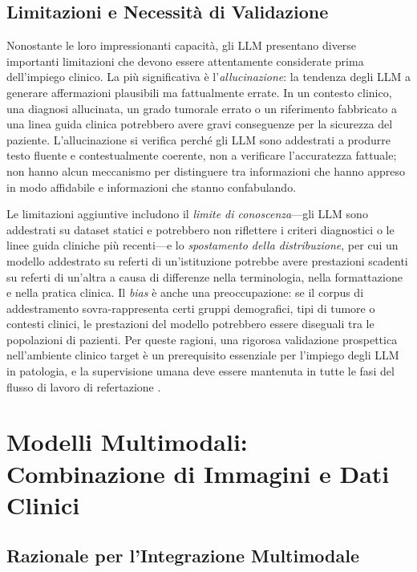\subsection{Limitazioni e Necessità di Validazione}

Nonostante le loro impressionanti capacità, gli LLM presentano diverse importanti limitazioni che devono essere attentamente considerate prima dell'impiego clinico. La più significativa è l'\emph{allucinazione}: la tendenza degli LLM a generare affermazioni plausibili ma fattualmente errate. In un contesto clinico, una diagnosi allucinata, un grado tumorale errato o un riferimento fabbricato a una linea guida clinica potrebbero avere gravi conseguenze per la sicurezza del paziente. L'allucinazione si verifica perché gli LLM sono addestrati a produrre testo fluente e contestualmente coerente, non a verificare l'accuratezza fattuale; non hanno alcun meccanismo per distinguere tra informazioni che hanno appreso in modo affidabile e informazioni che stanno confabulando.

Le limitazioni aggiuntive includono il \emph{limite di conoscenza}---gli LLM sono addestrati su dataset statici e potrebbero non riflettere i criteri diagnostici o le linee guida cliniche più recenti---e lo \emph{spostamento della distribuzione}, per cui un modello addestrato su referti di un'istituzione potrebbe avere prestazioni scadenti su referti di un'altra a causa di differenze nella terminologia, nella formattazione e nella pratica clinica. Il \emph{bias} è anche una preoccupazione: se il corpus di addestramento sovra-rappresenta certi gruppi demografici, tipi di tumore o contesti clinici, le prestazioni del modello potrebbero essere diseguali tra le popolazioni di pazienti. Per queste ragioni, una rigorosa validazione prospettica nell'ambiente clinico target è un prerequisito essenziale per l'impiego degli LLM in patologia, e la supervisione umana deve essere mantenuta in tutte le fasi del flusso di lavoro di refertazione \cite{song2023}.

\section{Modelli Multimodali: Combinazione di Immagini e Dati Clinici}
\label{sec:ch4_multimodal}

\subsection{Razionale per l'Integrazione Multimodale}

